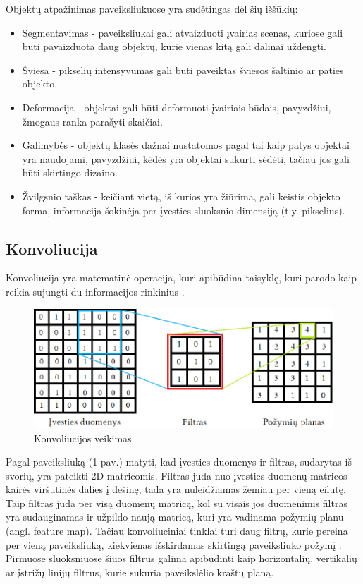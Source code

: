 \documentclass{VUMIFPSbakalaurinis}
\begin{document}
Objektų atpažinimas paveiksliukuose yra sudėtingas dėl šių iššūkių:
\begin{itemize}
\item Segmentavimas - paveiksliukai gali atvaizduoti įvairias scenas, kuriose gali būti pavaizduota daug objektų, kurie vienas kitą gali dalinai uždengti.
\item Šviesa - pikselių intensyvumas gali būti paveiktas šviesos šaltinio ar paties objekto.
\item Deformacija - objektai gali būti deformuoti įvairiais būdais, pavyzdžiui, žmogaus ranka parašyti skaičiai.
\item Galimybės - objektų klasės dažnai nustatomos pagal tai kaip patys objektai yra naudojami, pavyzdžiui, kėdės yra objektai sukurti sėdėti, tačiau jos gali būti skirtingo dizaino.
\item Žvilgsnio taškas - keičiant vietą, iš kurios yra žiūrima, gali keistis objekto forma, informacija šokinėja per įvesties sluoksnio dimensiją (t.y. pikselius). 
\end{itemize}

\subsection{Konvoliucija}
Konvoliucija yra matematinė operacija, kuri apibūdina taisyklę, kuri parodo kaip reikia sujungti du informacijos rinkinius \cite{Convolution-book}. 

\begin{figure}[h]
    \centering
    \includegraphics[width=1\textwidth]{img/matrica.png}
    \caption{Konvoliucijos veikimas}
\end{figure}

Pagal paveiksliuką (1 pav.) matyti, kad įvesties duomenys ir filtras, sudarytas iš svorių, yra pateikti 2D matricomis. Filtras juda nuo įvesties duomenų matricos kairės viršutinės dalies į dešinę, 
tada yra nuleidžiamas žemiau per vieną eilutę. Taip filtras juda per visą duomenų matricą, kol su visais jos duomenimis filtras yra sudauginamas ir užpildo naują matricą, kuri 
yra vadinama požymių planu (angl. feature map).
Tačiau konvoliuciniai tinklai turi daug filtrų, kurie pereina per vieną paveiksliuką, kiekvienas išskirdamas skirtingą paveiksliuko požymį \cite{DBLP:journals/corr/abs-1708-08711}.
Pirmuose sluoksniuose šiuos filtrus galima apibūdinti kaip horizontalių, vertikalių ar įstrižų linijų filtrus, kurie sukuria paveikslėlio 
kraštų planą.
\end{document}
